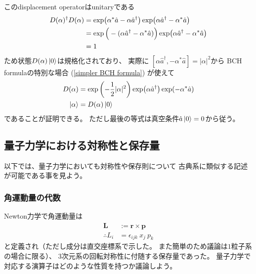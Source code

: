 このdisplacement operatorはunitaryである
\begin{align}
    D(\alpha)^\dagger D(\alpha) &=
    \exp(
        \alpha^* \hat{a}
        - \alpha \hat{a}^\dagger
    )
    \exp(
        \alpha\hat{a}^\dagger
        - \alpha^* \hat{a}
    )
\notag\\&=
    \exp\Big(
        - (
        \alpha \hat{a}^\dagger
        -
        \alpha^* \hat{a}
        )
    \Big)
    \exp(
        \alpha\hat{a}^\dagger
        - \alpha^* \hat{a}
    )
\notag\\&=
    1
\end{align}
ため状態$D(\alpha)\ket{0}$は規格化されており、
実際に
$[
    \alpha \hat{a}^\dagger,
     - \alpha^* \hat{a}
]
= |\alpha|^2$から
BCH formulaの特別な場合
(\ref{simpler BCH formula})
が使えて
\begin{align}
    D(\alpha) &= \exp\left(
        - \dfrac{1}{2}|\alpha|^2
    \right)
    \exp(\alpha \hat{a}^\dagger)
    \exp( - \alpha^* \hat{a})
\notag\\
    \ket{\alpha} &= D(\alpha) \ket{0}
\end{align}
であることが証明できる。
ただし最後の等式は真空条件$\hat{a}\ket{0}=0$から従う。

\subsection{量子力学における対称性と保存量}

以下では、量子力学においても対称性や保存則について
古典系に類似する記述が可能である事を見よう。

\subsubsection{角運動量の代数}
\label{subsubsec: angular momentum}

Newton力学で角運動量は
\begin{subequations}
\begin{align}
    \bm{L} &:= \bm{r} \times \bm{p}
    \\\therefore
    L_i &= \epsilon_{ijk} \ x_j \ p_k
\end{align}
\end{subequations}
と定義され（ただし成分は直交座標系で示した。
また簡単のため議論は$1$粒子系の場合に限る）、
3次元系の回転対称性に付随する保存量であった。
量子力学で対応する演算子はどのような性質を持つか議論しよう。

